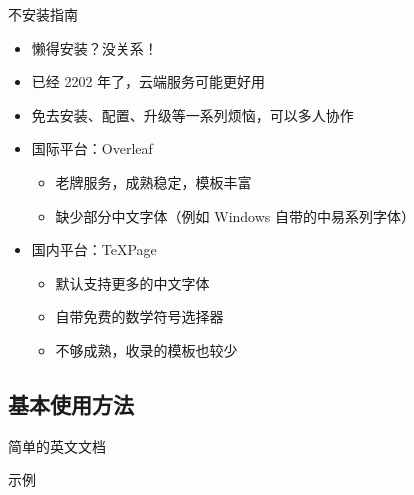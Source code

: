 \begin{frame}{不安装指南}
  \begin{itemize}
    \item 懒得安装？没关系！
    \item 已经 2202 年了，云端服务可能更好用
    \item 免去安装、配置、升级等一系列烦恼，可以多人协作
    \item 国际平台：Overleaf 
          \begin{itemize}
            \item 老牌服务，成熟稳定，模板丰富
            \item 缺少部分中文字体（例如 Windows 自带的中易系列字体）
          \end{itemize}
    \item 国内平台：TeXPage 
          \begin{itemize}
            \item 默认支持更多的中文字体
            \item 自带免费的数学符号选择器
            \item 不够成熟，收录的模板也较少
          \end{itemize}
  \end{itemize}

\end{frame}

\subsection{基本使用方法}

\begin{frame}[fragile]{简单的英文文档}
  \begin{exampleblock}{示例}
  \end{exampleblock}
\end{frame}

